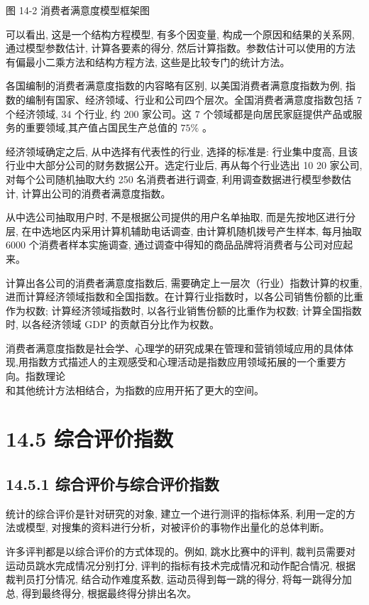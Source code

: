\documentclass[10pt]{article}
\begin{document}
\begin{CJK*}{UTF8}{bsmi}
\begin{center}
\end{center}

图 14-2 消费者满意度模型框架图

可以看出, 这是一个结构方程模型, 有多个因变量, 构成一个原因和结果的关系网,通过模型参数估计, 计算各要素的得分, 然后计算指数。参数估计可以使用的方法有偏最小二乘方法和结构方程方法, 这些是比较专门的统计方法。

各国编制的消费者满意度指数的内容略有区别, 以美国消费者满意度指数为例, 指数的编制有国家、经济领域、行业和公司四个层次。全国消费者满意度指数包括 7 个经济领域, 34 个行业, 约 200 家公司。这 7 个领域都是向居民家庭提供产品或服务的重要领域,其产值占国民生产总值的 $75 \%$ 。

经济领域确定之后, 从中选择有代表性的行业, 选择的标准是: 行业集中度高, 且该行业中大部分公司的财务数据公开。选定行业后, 再从每个行业选出 10 20 家公司, 对每个公司随机抽取大约 250 名消费者进行调查, 利用调查数据进行模型参数估计, 计算出公司的消费者满意度指数。

从中选公司抽取用户时, 不是根据公司提供的用户名单抽取, 而是先按地区进行分层, 在中选地区内采用计算机辅助电话调查, 由计算机随机拨号产生样本, 每月抽取 6000 个消费者样本实施调查, 通过调查中得知的商品品牌将消费者与公司对应起来。

计算出各公司的消费者满意度指数后, 需要确定上一层次（行业）指数计算的权重,进而计算经济领域指数和全国指数。在计算行业指数时，以各公司销售份额的比重作为权数; 计算经济领域指数时, 以各行业销售份额的比重作为权数; 计算全国指数时, 以各经济领域 GDP 的贡献百分比作为权数。

消费者满意度指数是社会学、心理学的研究成果在管理和营销领域应用的具体体现,用指数方式描述人的主观感受和心理活动是指数应用领域拓展的一个重要方向。指数理论\\
和其他统计方法相结合，为指数的应用开拓了更大的空间。

\section*{14.5 综合评价指数}
\subsection*{14.5.1 综合评价与综合评价指数}
统计的综合评价是针对研究的对象, 建立一个进行测评的指标体系, 利用一定的方法或模型, 对搜集的资料进行分析，对被评价的事物作出量化的总体判断。

许多评判都是以综合评价的方式体现的。例如, 跳水比赛中的评判, 裁判员需要对运动员跳水完成情况分别打分, 评判的指标有技术完成情况和动作配合情况, 根据裁判员打分情况, 结合动作难度系数, 运动员得到每一跳的得分, 将每一跳得分加总, 得到最终得分, 根据最终得分排出名次。


\end{CJK*}
\end{document}
